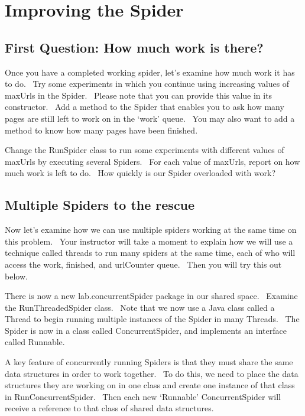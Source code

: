 \documentclass[letterpaper,10pt,openany,oneside]{sphinxmanual}
\begin{document}
\chapter{Improving the Spider}
\label{SpiderLabpart2/SpiderLabpart2:improving-the-spider}\label{SpiderLabpart2/SpiderLabpart2::doc}

\section{First Question: How much work is there?}
\label{SpiderLabpart2/SpiderLabpart2:first-question-how-much-work-is-there}
Once you have a completed working spider, let’s examine how much
work it has to do.  Try some experiments in which you continue
using increasing values of maxUrls in the Spider.  Please note that
you can provide this value in its constructor.  Add a method to the
Spider that enables you to ask how many pages are still left to
work on in the ‘work’ queue.  You may also want to add a method to
know how many pages have been finished.

Change the RunSpider class to run some experiments with different
values of maxUrls by executing several Spiders.  For each value of
maxUrls, report on how much work is left to do.  How quickly is our
Spider overloaded with work?


\section{Multiple Spiders to the rescue}
\label{SpiderLabpart2/SpiderLabpart2:multiple-spiders-to-the-rescue}
Now let’s examine how we can use multiple spiders working at the
same time on this problem.  Your instructor will take a moment to
explain how we will use a technique called threads to run many
spiders at the same time, each of who will access the work,
finished, and urlCounter queue.  Then you will try this out below.

There is now a new lab.concurrentSpider package in our shared
space.  Examine the RunThreadedSpider class.  Note that we now use
a Java class called a Thread to begin running multiple instances of
the Spider in many Threads.  The Spider is now in a class called
ConcurrentSpider, and implements an interface called Runnable.

A key feature of concurrently running Spiders is that they must
share the same data structures in order to work together.  To do
this, we need to place the data structures they are working on in
one class and create one instance of that class in
RunConcurrentSpider.  Then each new ‘Runnable’ ConcurrentSpider
will receive a reference to that class of shared data structures.
\end{document}
